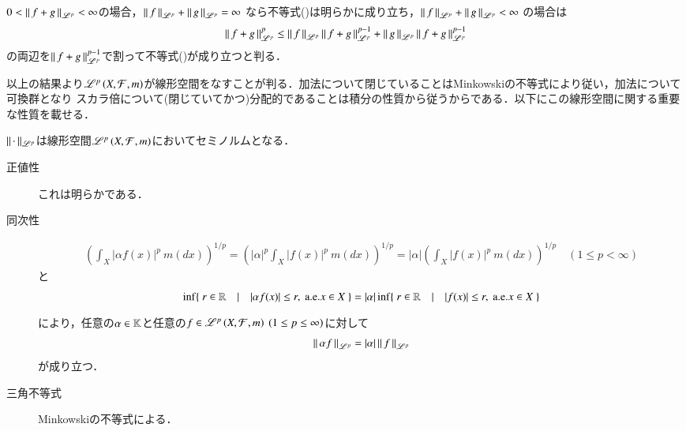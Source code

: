 \begin{qst}
\begin{prf}
\begin{description}
			$0 < \left\|\, f+g\, \right\|_{\mathscr{L}^p} < \infty$の場合，$\left\|\, f\, \right\|_{\mathscr{L}^p} + \left\|\, g\, \right\|_{\mathscr{L}^p} = \infty$
			なら不等式()は明らかに成り立ち，$\left\|\, f\, \right\|_{\mathscr{L}^p} + \left\|\, g\, \right\|_{\mathscr{L}^p} < \infty$
			の場合は
			\begin{align}
				\left\|\, f+g\, \right\|_{\mathscr{L}^p}^p \leq \left\|\, f\, \right\|_{\mathscr{L}^p}\left\|\, f+g\, \right\|_{\mathscr{L}^p}^{p-1} + \left\|\, g\, \right\|_{\mathscr{L}^p}\left\|\, f+g\, \right\|_{\mathscr{L}^p}^{p-1}
			\end{align}
			の両辺を$\left\|\, f+g\, \right\|_{\mathscr{L}^p}^{p-1}$で割って不等式()が成り立つと判る．
			\QED
	\end{description}
\end{prf}

以上の結果より$\mathscr{L}^{p} \left(X,\mathcal{F},m\right)$が線形空間をなすことが判る．加法について閉じていることはMinkowskiの不等式により従い，加法について可換群となり
スカラ倍について(閉じていてかつ)分配的であることは積分の性質から従うからである．以下にこの線形空間に関する重要な性質を載せる．

\begin{lem}
	$\left\|\, \cdot\, \right\|_{\mathscr{L}^p}$は線形空間$\mathscr{L}^{p} \left(X,\mathcal{F},m\right)$においてセミノルムとなる．
\end{lem}
\begin{prf}
	\begin{description}
	\item[正値性] これは明らかである．
	\item[同次性] 
		\begin{align}
			\left( \int_{X} |\alpha f(x)|^p\ m(dx) \right)^{1/p} = \left( |\alpha|^p \int_{X} |f(x)|^p\ m(dx) \right)^{1/p} 
			= |\alpha| \left( \int_{X} |f(x)|^p\ m(dx) \right)^{1/p} \quad (1 \leq p < \infty)
		\end{align}
		と
		\begin{align}
			\inf{}{\{\ r \in \R\quad |\quad |\alpha f(x)| \leq r,\ \mathrm{a.e.}x \in X\ \}} = |\alpha|\inf{}{\{\ r \in \R\quad |\quad |f(x)| \leq r,\ \mathrm{a.e.}x \in X\ \}}
		\end{align}
		により，任意の$\alpha \in \mathbb{K}$と任意の$f \in \mathscr{L}^{p} \left(X,\mathcal{F},m\right)\ (1 \leq p \leq \infty)$に対して
		\begin{align}
			\left\|\, \alpha f\, \right\|_{\mathscr{L}^p} = |\alpha|\left\|\, f\, \right\|_{\mathscr{L}^p}
		\end{align}
		が成り立つ．
	\item[三角不等式] Minkowskiの不等式による．
	\end{description}
	\QED
\end{prf}


\end{qst}
